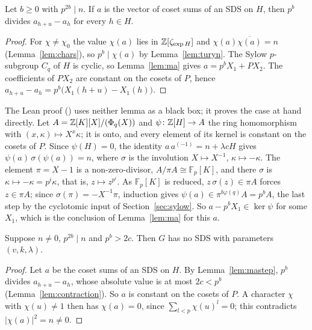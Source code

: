 \begin{lemma}\label{lem:mastep}
Let $b \ge 0$ with $p^{2b} \mid n$. If $a$ is the vector of coset sums of an SDS on $H$, then
$p^b$ divides $a_{h+u} - a_h$ for every $h \in H$.
\end{lemma}

\begin{proof}
For $\chi \ne \chi_0$ the value $\chi(a)$ lies in $\mathbb{Z}[\zeta_{\exp H}]$ and
$\chi(a)\overline{\chi(a)} = n$ (Lemma~\ref{lem:chars}), so $p^b \mid \chi(a)$ by
Lemma~\ref{lem:turyn}. The Sylow $p$-subgroup $C_q$ of $H$ is cyclic, so Lemma~\ref{lem:ma} gives
$a = p^b X_1 + P X_2$. The coefficients of $P X_2$ are constant on the cosets of $P$, hence
$a_{h+u} - a_h = p^b \bigl(X_1(h+u) - X_1(h)\bigr)$.
\end{proof}

The Lean proof () uses neither lemma as a black
box; it proves the case at hand directly. Let $A = \mathbb{Z}[K][X]/(\Phi_q(X))$ and
$\psi \colon \mathbb{Z}[H] \to A$ the ring homomorphism with $(x, \kappa) \mapsto X^x \kappa$; it is onto,
and every element of its kernel is constant on the cosets of $P$. Since $\psi(H) = 0$, the
identity $a\,a^{(-1)} = n + \lambda c H$ gives $\psi(a)\,\sigma(\psi(a)) = n$, where $\sigma$ is the
involution $X \mapsto X^{-1}$, $\kappa \mapsto -\kappa$. The element $\pi = X - 1$ is a
non-zero-divisor, $A/\pi A \cong \mathbb{F}_p[K]$, and there $\sigma$ is $\kappa \mapsto -\kappa =
p^i\kappa$, that is, $z \mapsto z^{p^i}$. As $\mathbb{F}_p[K]$ is reduced, $z\,\sigma(z) \in \pi A$
forces $z \in \pi A$; since $\sigma(\pi) = -X^{-1}\pi$, induction gives $\psi(a) \in
\pi^{b\varphi(q)} A = p^b A$, the last step by the cyclotomic input of
Section~\ref{sec:sylow}. So $a - p^b X_1 \in \ker\psi$ for some $X_1$, which is the conclusion of
Lemma~\ref{lem:ma} for this $a$.

\begin{theorem}\label{thm:z24}
Suppose $n \ne 0$, $p^{2b} \mid n$ and $p^b > 2c$. Then $G$ has no SDS with parameters
$(v,k,\lambda)$.
\end{theorem}

\begin{proof}
Let $a$ be the coset sums of an SDS on $H$. By Lemma~\ref{lem:mastep}, $p^b$ divides
$a_{h+u} - a_h$, whose absolute value is at most $2c < p^b$ (Lemma~\ref{lem:contraction}). So $a$
is constant on the cosets of $P$. A character $\chi$ with $\chi(u) \ne 1$ then has
$\chi(a) = 0$, since $\sum_{l < p} \chi(u)^l = 0$; this contradicts $|\chi(a)|^2 = n \ne 0$.
\end{proof}

